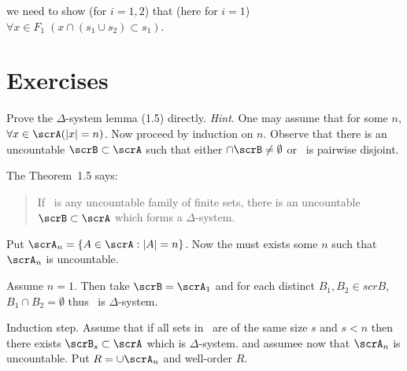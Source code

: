 we need to show (for \(i=1,2\)) that (here for \(i=1\))
\(\forall x \in F_1\;(x\cap (s_1\cup s_2) \subset s_1)\).

\section{Exercises}

\begin{enumerate}

\begin{excopy}
Prove the \(\Delta\)-system lemma (1.5) directly. 
\emph{Hint}. One may assume that for
some $n$, \(\forall x \in \scrA (|x| =n)\). 
Now proceed by induction on $n$. Observe that
there is an uncountable \(\scrB \subset \scrA\) such that either 
\(\cap \scrB \neq \emptyset\) or \scrB\ is pairwise
disjoint.
\end{excopy}

The Theorem~1.5 says:
\begin{quote}
If \scrA\ is any uncountable family of finite sets, there is an uncountable
\(\scrB \subset \scrA\) which forms a \(\Delta\)-system.
\end{quote}
Put \(\scrA_n = \{A \in \scrA: |A|=n\}\).
Now the must exists some $n$ such that \(\scrA_n\) is uncountable.

Assume \(n=1\). Then take \(\scrB = \scrA_1\) 
and for each distinct \(B_1,B_2 \in scrB\), \(B_1\cap B_2 = \emptyset\)
thus \scrB\ is \(\Delta\)-system.

Induction step.
Assume that if all sets in \scrA\ are of the same size $s$ and \(s<n\)
then there exists \(\scrB_s\subset \scrA\) which is \(\Delta\)-system.
and assumee now that \(\scrA_n\) is uncountable.
Put \(R = \cup \scrA_n\) and well-order $R$.

\unfinished


\end{enumerate}
